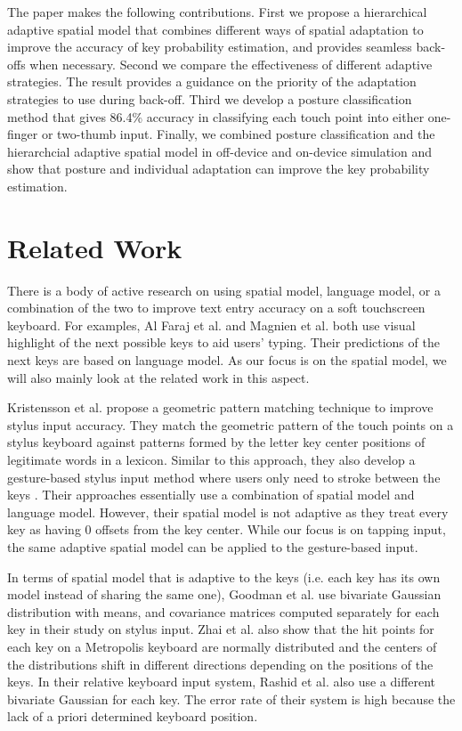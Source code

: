 \documentclass{sigchi}
\begin{document}
The paper makes the following contributions. First
we propose a hierarchical adaptive spatial model that combines different
ways of spatial adaptation to improve the accuracy of key probability estimation, and provides seamless back-offs when necessary.
Second we compare the effectiveness of different adaptive strategies.
The result provides a guidance on the priority of the adaptation strategies to use during 
back-off. Third we develop a posture classification method that gives 86.4\% accuracy in
classifying each touch point into either one-finger or two-thumb input. Finally, we 
combined posture classification and the hierarchcial adaptive spatial model in off-device and 
on-device simulation and show that posture and individual adaptation can improve the key probability estimation.

\section{Related Work}
There is a body of active research on using spatial model, language model, or a combination
of the two to improve text entry accuracy on a soft touchscreen keyboard. For examples, 
Al Faraj et al. \cite{AlFaraj:2009} and Magnien et al. \cite{Magnien:2004} both use
visual highlight of the next possible keys to aid users' typing. Their predictions of the next keys are
based on language model. As our focus is on the 
spatial model, we will also mainly look at the related work in this aspect.    

Kristensson et al. \cite{Kristensson:2005} propose a geometric pattern matching technique to improve 
stylus input accuracy. They match the geometric pattern of the touch points on a stylus keyboard against patterns formed by 
the letter key center positions of legitimate words in a lexicon. Similar to this approach,
they also develop a gesture-based stylus input method where users only need to stroke between the keys \cite{Kristensson:2004}.
Their approaches essentially use a combination of spatial model and language model. However, 
their spatial model is not adaptive as they treat every key as having 0 offsets from 
the key center. While our focus is on tapping input, the same adaptive spatial model
can be applied to the gesture-based input.

In terms of spatial model that is adaptive to the keys (i.e. each key has its own model instead of
sharing the same one), Goodman et al. \cite{Goodman:2002} use bivariate Gaussian distribution with means, and
covariance matrices computed separately for each key in their study on stylus input. Zhai et al. \cite{Zhai:2002} also show that
the hit points for each key on a Metropolis keyboard \cite{Zhai:2000} are normally distributed and 
the centers of the distributions shift in different directions depending on the positions of
the keys. In their relative keyboard input system, Rashid et al. \cite{Rashid:2008} also use a different bivariate
Gaussian for each key. The error rate of their system is high because the lack of 
a priori determined keyboard position.
\end{document}
